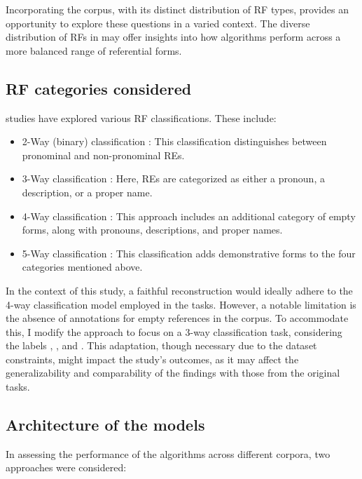 Incorporating the \wsj corpus, with its distinct distribution of RF types, provides an opportunity to explore these questions in a varied context. The diverse distribution of RFs in \wsj may offer insights into how algorithms perform across a more balanced range of referential forms. 

\subsection{RF categories considered}\label{subsec:refcategories}
\context studies have explored various RF classifications. These include:

\begin{itemize}
	\item 2-Way (binary) classification \citep{mccoy1999generating,henschel2000pronominalization,poesio2004centering}: This classification distinguishes between pronominal and non-pronominal REs.
	\item 3-Way classification \citep{kibrik2016referential}: Here, REs are categorized as either a pronoun, a description, or a proper name.
	\item 4-Way classification \citep{belz2010generating}: This approach includes an additional category of empty forms, along with pronouns, descriptions, and proper names.
	\item 5-Way classification \citep{castro-ferreira-etal-2016-towards-variation}: This classification adds demonstrative forms to the four categories mentioned above.
\end{itemize}


In the context of this study, a faithful reconstruction would ideally adhere to the 4-way classification model employed in the \grec tasks. However, a notable limitation is the absence of annotations for empty references in the \wsj corpus. To accommodate this, I modify the approach to focus on a 3-way classification task, considering the labels , , and . This adaptation, though necessary due to the dataset constraints, might impact the study's outcomes, as it may affect the generalizability and comparability of the findings with those from the original \grec tasks.

\subsection{Architecture of the models}\label{algoreconstruction}
In assessing the performance of the algorithms across different corpora, two approaches were considered:

